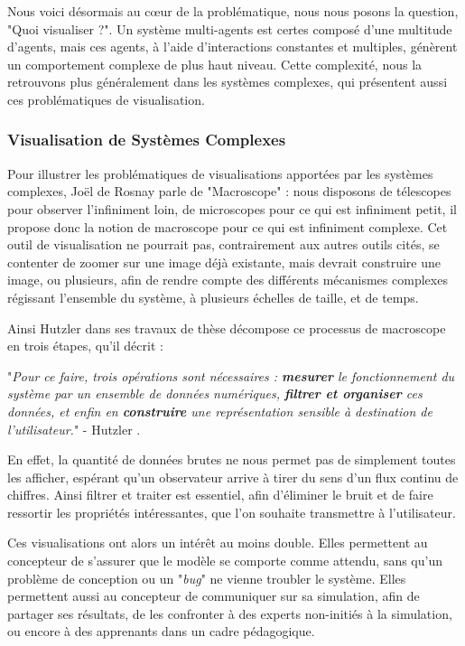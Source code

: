 		Nous voici désormais au cœur de la problématique, nous nous posons la question, "Quoi visualiser ?". Un système multi-agents est certes composé d'une multitude d'agents, mais ces agents, à l'aide d'interactions constantes et multiples, génèrent un comportement complexe de plus haut niveau. Cette complexité, nous la retrouvons plus généralement dans les systèmes complexes, qui présentent aussi ces problématiques de visualisation.
		
		\subsubsection{Visualisation de Systèmes Complexes}
		\label{sectionVisuComplexe}
		
		Pour illustrer les problématiques de visualisations apportées par les systèmes complexes, Joël de Rosnay parle de "Macroscope" \cite{de_rosnay_macroscope_1975} : nous disposons de télescopes pour observer l'infiniment loin, de microscopes pour ce qui est infiniment petit, il propose donc la notion de macroscope pour ce qui est infiniment complexe. Cet outil de visualisation ne pourrait pas, contrairement aux autres outils cités, se contenter de zoomer sur une image déjà existante, mais devrait construire une image, ou plusieurs, afin de rendre compte des différents mécanismes complexes régissant l'ensemble du système, à plusieurs échelles de taille, et de temps.
		
		Ainsi Hutzler dans ses travaux de thèse \cite{hutzler_du_2000} décompose ce processus de macroscope en trois étapes, qu'il décrit :
		
		"\textit{Pour ce faire, trois opérations sont nécessaires : \textbf{mesurer} le fonctionnement du système par un ensemble de données numériques, \textbf{filtrer et organiser} ces données, et enfin en \textbf{construire} une représentation sensible à destination de l'utilisateur.}" - Hutzler \cite{hutzler_du_2000}.

	En effet, la quantité de données brutes ne nous permet pas de simplement toutes les afficher, espérant qu'un observateur arrive à tirer du sens d'un flux continu de chiffres. Ainsi filtrer et traiter est essentiel, afin d'éliminer le bruit et de faire ressortir les propriétés intéressantes, que l'on souhaite transmettre à l'utilisateur.

		
		 Ces visualisations ont alors un intérêt au moins double. Elles permettent au concepteur de s'assurer que le modèle se comporte comme attendu, sans qu'un problème de conception ou un "\textit{bug}" ne vienne troubler le système. Elles permettent aussi au concepteur de communiquer sur sa simulation, afin de partager ses résultats, de les confronter à des experts non-initiés à la simulation, ou encore à des apprenants dans un cadre pédagogique.

